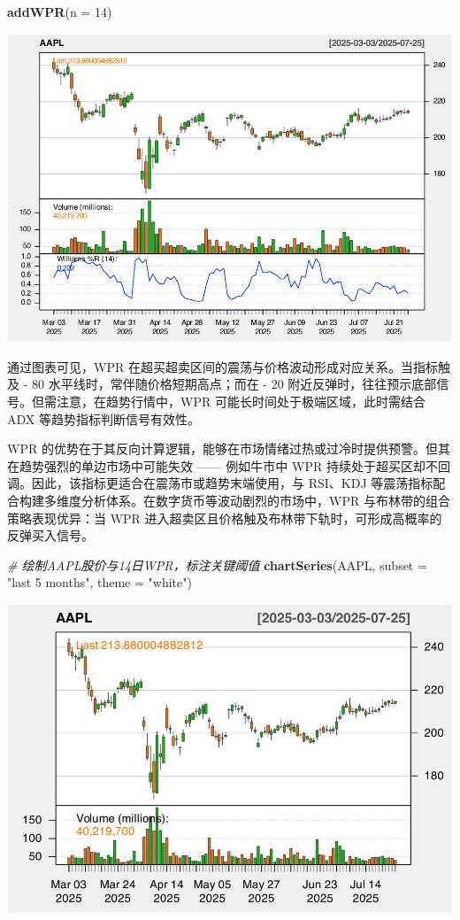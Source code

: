 \documentclass[]{ctexbook}
\newenvironment{Shaded}{\begin{snugshade}}{\end{snugshade}}
\newcommand{\AttributeTok}[1]{\textcolor[rgb]{0.13,0.29,0.53}{#1}}
\newcommand{\CommentTok}[1]{\textcolor[rgb]{0.56,0.35,0.01}{\textit{#1}}}
\newcommand{\DecValTok}[1]{\textcolor[rgb]{0.00,0.00,0.81}{#1}}
\newcommand{\FunctionTok}[1]{\textcolor[rgb]{0.13,0.29,0.53}{\textbf{#1}}}
\newcommand{\NormalTok}[1]{#1}
\newcommand{\StringTok}[1]{\textcolor[rgb]{0.31,0.60,0.02}{#1}}
\begin{document}
\begin{Shaded}
\begin{Highlighting}[]
\FunctionTok{addWPR}\NormalTok{(}\AttributeTok{n =} \DecValTok{14}\NormalTok{)}
\end{Highlighting}
\end{Shaded}

\includegraphics[width=0.9\linewidth]{QuantmodHandbook_files/figure-latex/wpr-2}

通过图表可见，WPR 在超买超卖区间的震荡与价格波动形成对应关系。当指标触及 - 80 水平线时，常伴随价格短期高点；而在 - 20 附近反弹时，往往预示底部信号。但需注意，在趋势行情中，WPR 可能长时间处于极端区域，此时需结合 ADX 等趋势指标判断信号有效性。

WPR 的优势在于其反向计算逻辑，能够在市场情绪过热或过冷时提供预警。但其在趋势强烈的单边市场中可能失效 ------ 例如牛市中 WPR 持续处于超买区却不回调。因此，该指标更适合在震荡市或趋势末端使用，与 RSI、KDJ 等震荡指标配合构建多维度分析体系。在数字货币等波动剧烈的市场中，WPR 与布林带的组合策略表现优异：当 WPR 进入超卖区且价格触及布林带下轨时，可形成高概率的反弹买入信号。

\begin{Shaded}
\begin{Highlighting}[]
\CommentTok{\# 绘制AAPL股价与14日WPR，标注关键阈值}
\FunctionTok{chartSeries}\NormalTok{(AAPL, }\AttributeTok{subset =} \StringTok{"last 5 months"}\NormalTok{, }\AttributeTok{theme =} \StringTok{"white"}\NormalTok{)}
\end{Highlighting}
\end{Shaded}

\includegraphics[width=0.9\linewidth]{QuantmodHandbook_files/figure-latex/wpr_2-1}
\end{document}
